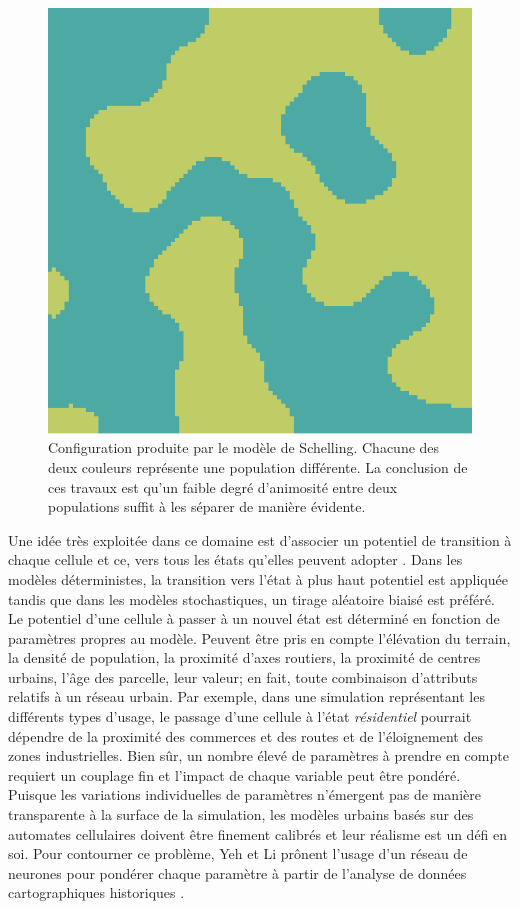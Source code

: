 \documentclass[12pt]{article}
\begin{document}
\begin{figure}[H]
  \centering
  \includegraphics[width=.6\linewidth]{images/schelling.png}
  \caption{Configuration produite par le modèle de Schelling. Chacune
    des deux couleurs représente une population différente. La
    conclusion de ces travaux est qu'un faible degré d'animosité entre
    deux populations suffit à les séparer de manière évidente.}
  \label{fig:schelling}
\end{figure}

Une idée très exploitée dans ce domaine est d'associer un potentiel de
transition à chaque cellule et ce, vers tous les états qu'elles
peuvent adopter \cite{Benenson2004}. Dans les modèles déterministes,
la transition vers l'état à plus haut potentiel est appliquée tandis
que dans les modèles stochastiques, un tirage aléatoire biaisé est
préféré. Le potentiel d'une cellule à passer à un nouvel état est
déterminé en fonction de paramètres propres au modèle. Peuvent être
pris en compte l'élévation du terrain, la densité de population, la
proximité d'axes routiers, la proximité de centres urbains, l'âge des
parcelle, leur valeur; en fait, toute combinaison d'attributs relatifs
à un réseau urbain. Par exemple, dans une simulation représentant les
différents types d'usage, le passage d'une cellule à l'état
\textit{résidentiel} pourrait dépendre de la proximité des commerces
et des routes et de l'éloignement des zones industrielles. Bien sûr,
un nombre élevé de paramètres à prendre en compte requiert un couplage
fin et l'impact de chaque variable peut être pondéré. Puisque les
variations individuelles de paramètres n'émergent pas de manière
transparente à la surface de la simulation, les modèles urbains basés
sur des automates cellulaires doivent être finement calibrés et leur
réalisme est un défi en soi. Pour contourner ce problème, Yeh et Li
prônent l'usage d'un réseau de neurones pour pondérer chaque paramètre
à partir de l'analyse de données cartographiques historiques
\cite{Yeh2002}.
\end{document}
